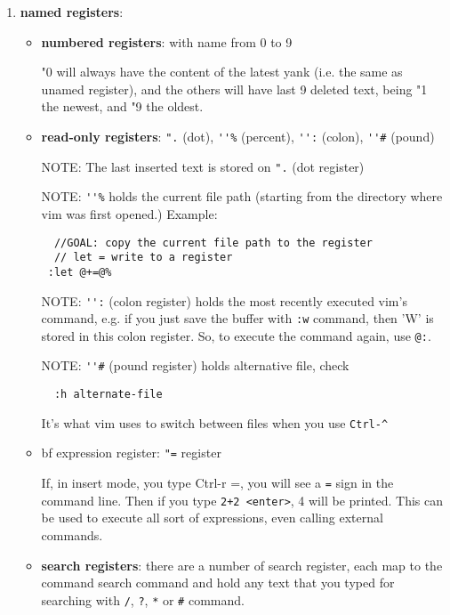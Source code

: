 \begin{enumerate}
  \item {\bf named registers}:
  \begin{itemize}
    \item {\bf numbered registers}: with name from 0 to 9
    
    "0 will always have the content of the latest yank (i.e. the same as unamed
    register), and the others will have last 9 deleted text, being "1 the
    newest, and "9 the oldest.
    
    \item {\bf read-only registers}: \verb!".! (dot), \verb!''%! (percent),
    \verb!'':! (colon), \verb!''#! (pound)
    
    NOTE: The last inserted text is stored on \verb!".! (dot register)
    
    NOTE: \verb!''%! holds the current file path (starting from the directory
    where vim was first opened.) Example:
 \begin{verbatim}
  //GOAL: copy the current file path to the register
  // let = write to a register
 :let @+=@%
 \end{verbatim}
    
    NOTE: \verb!'':! (colon register) holds the most recently executed
    vim's command, e.g. if you just save the buffer with \verb!:w! command, then
    'W' is stored in this colon register.
    So, to execute the command again, use \verb!@:!. 
    
    NOTE: \verb!''#! (pound register) holds alternative file, check
  \begin{verbatim}
  :h alternate-file
  \end{verbatim}
    
    It's what vim uses to switch between files when you use \verb!Ctrl-^!

    \item {bf expression register}: \verb!"=! register 
    
    If, in insert mode, you type Ctrl-r =, you will see a \verb!=! sign in the
    command line. Then if you type \verb!2+2 <enter>!, 4 will be printed. This
    can be used to execute all sort of expressions, even calling external
    commands.
    
    \item {\bf search registers}: there are a number of search register, each
    map to the command search command and   hold any text that you typed for
    searching with \verb!/!, \verb!?!, \verb!*! or \verb!#! command.
    

\end{itemize}
\end{enumerate}
